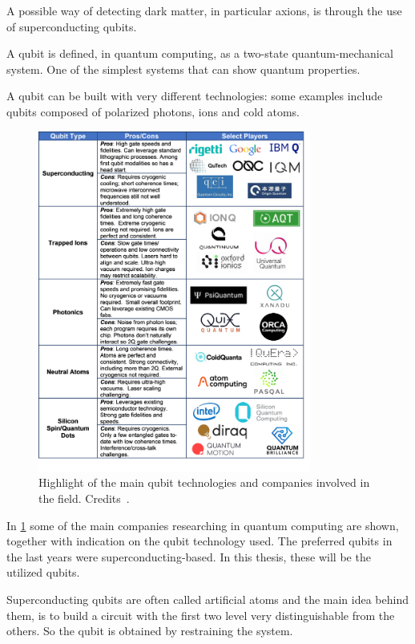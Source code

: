 
A possible way of detecting dark matter, in particular axions, is through the use of superconducting qubits.

A qubit is defined, in quantum computing, as a two-state quantum-mechanical system. One of the simplest systems that can show quantum properties.

A qubit can be built with very different technologies: some examples include qubits composed of polarized photons, ions and cold atoms. 
\begin{figure}[H]
    \centering
    \includegraphics[width=0.8\textwidth]{Theory/figures/qubit_techs.png}
    \caption{Highlight of the main qubit technologies and companies involved in the field. Credits~\cite{quantumtech-blog}.}
    \label{fig:qubit_players}
\end{figure}
In \cref{fig:qubit_players} some of the main companies researching in quantum computing are shown, together with indication on the qubit technology used.
The preferred qubits in the last years were superconducting-based. 
In this thesis, these will be the utilized qubits.


Superconducting qubits are often called artificial atoms and the main idea behind them, is to build a circuit with the first two level very distinguishable from the others. 
So the qubit is obtained by restraining the system.

